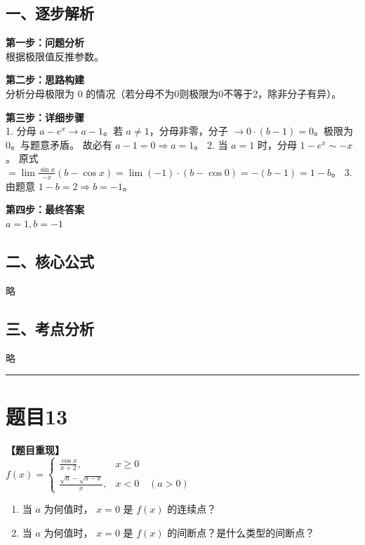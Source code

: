 \documentclass[12pt, a4paper]{ctexart}
\newcommand{\TopSeparator}{
    \par\noindent\rule{\textwidth}{1.5pt}\vspace{0.5em} %
}
\newenvironment{RedAnalysis}{
    \par
    \color{red} %
}{
    \par
    \color{black} %
}
\begin{document}
\begin{RedAnalysis}

\subsection*{一、逐步解析}

\textbf{第一步：问题分析} \\
根据极限值反推参数。

\textbf{第二步：思路构建} \\
分析分母极限为 0 的情况（若分母不为0则极限为0不等于2，除非分子有异）。

\textbf{第三步：详细步骤} \\
1. 分母 $a - e^x \to a-1$。若 $a \ne 1$，分母非零，分子 $\to 0 \cdot (b-1) = 0$。极限为0。与题意矛盾。
   故必有 $a - 1 = 0 \Rightarrow a = 1$。
2. 当 $a=1$ 时，分母 $1-e^x \sim -x$。
   原式 $= \lim \frac{\sin x}{-x}(b-\cos x) = \lim (-1) \cdot (b-\cos 0) = -(b-1) = 1-b$。
3. 由题意 $1-b = 2 \Rightarrow b = -1$。

\textbf{第四步：最终答案} \\
$a=1, b=-1$

\subsection*{二、核心公式}
略

\subsection*{三、考点分析}
略

\end{RedAnalysis}

\vspace{2em}

\TopSeparator
\section*{题目13}

\textbf{【题目重现】} \\
$ f(x) = \begin{cases} \frac{\cos x}{x+2}, & x \geq 0 \\ \frac{\sqrt{a} - \sqrt{a - x}}{x}, & x < 0 \quad (a > 0) \end{cases} $
\begin{enumerate}
    \item 当 $a$ 为何值时， $x=0$ 是 $ f(x) $ 的连续点？
    \item 当 $a$ 为何值时， $x=0$ 是 $ f(x) $ 的间断点？是什么类型的间断点？
\end{enumerate}
\end{document}
